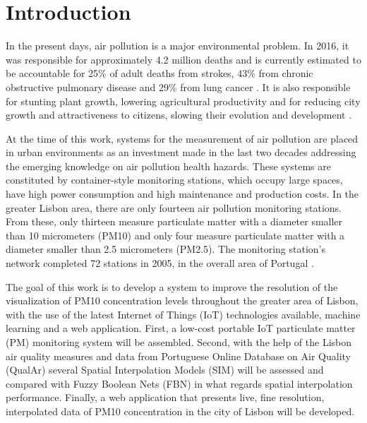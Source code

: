\section{Introduction}
\label{sec:intro}

In the present days, air pollution is a major environmental problem. In 2016, it was responsible for approximately 4.2 million deaths and is currently estimated to be accountable for 25\% of adult deaths from strokes, 43\% from chronic obstructive pulmonary disease and 29\% from lung cancer \cite{WHO2018}. It is also responsible for stunting plant growth, lowering agricultural productivity and for reducing city growth and attractiveness to citizens, slowing their evolution and development \cite{GSMA2018}.

At the time of this work, systems for the measurement of air pollution are placed in urban environments as an investment made in the last two decades addressing the emerging knowledge on air pollution health hazards. These systems are constituted by container-style monitoring stations, which occupy large spaces, have high power consumption and high maintenance and production costs. In the greater Lisbon area, there are only fourteen air pollution monitoring stations. From these, only thirteen measure particulate matter with a diameter smaller than 10 micrometers (PM10) and only four measure particulate matter with a diameter smaller than 2.5 micrometers (PM2.5). The monitoring station’s network completed 72 stations in 2005, in the overall area of Portugal \cite{APA2008}.

The goal of this work is to develop a system to improve the resolution of the visualization of PM10 concentration levels throughout the greater area of Lisbon, with the use of the latest Internet of Things (IoT) technologies available, machine learning and a web application. First, a low-cost portable IoT particulate matter (PM) monitoring system will be assembled. Second, with the help of the Lisbon air quality measures and data from Portuguese Online Database on Air Quality (QualAr) several Spatial Interpolation Models (SIM) will be assessed and compared with Fuzzy Boolean Nets (FBN) in what regards spatial interpolation performance. Finally, a web application that presents live, fine resolution, interpolated data of PM10 concentration in the city of Lisbon will be developed.
